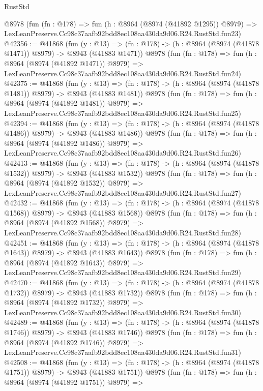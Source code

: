 \begin{lexlean}{RustStd}
\begin{coremodule}
    @8978
    (fun (fn : @178) =>
    fun (h : @8964 (@8974 (@41892 @1295)) @8979) =>
    LexLeanPreserve.Cc98c37aafb92bdd8ec108aa430da9d06.R24.RustStd.fun23)
@42356 := @41868
    (fun (y : @13) =>
    (fn : @178) -> (h : @8964 (@8974 (@41878 @1471)) @8979) -> @8943 (@41883 @1471))
    @8978
    (fun (fn : @178) =>
    fun (h : @8964 (@8974 (@41892 @1471)) @8979) =>
    LexLeanPreserve.Cc98c37aafb92bdd8ec108aa430da9d06.R24.RustStd.fun24)
@42375 := @41868
    (fun (y : @13) =>
    (fn : @178) -> (h : @8964 (@8974 (@41878 @1481)) @8979) -> @8943 (@41883 @1481))
    @8978
    (fun (fn : @178) =>
    fun (h : @8964 (@8974 (@41892 @1481)) @8979) =>
    LexLeanPreserve.Cc98c37aafb92bdd8ec108aa430da9d06.R24.RustStd.fun25)
@42394 := @41868
    (fun (y : @13) =>
    (fn : @178) -> (h : @8964 (@8974 (@41878 @1486)) @8979) -> @8943 (@41883 @1486))
    @8978
    (fun (fn : @178) =>
    fun (h : @8964 (@8974 (@41892 @1486)) @8979) =>
    LexLeanPreserve.Cc98c37aafb92bdd8ec108aa430da9d06.R24.RustStd.fun26)
@42413 := @41868
    (fun (y : @13) =>
    (fn : @178) -> (h : @8964 (@8974 (@41878 @1532)) @8979) -> @8943 (@41883 @1532))
    @8978
    (fun (fn : @178) =>
    fun (h : @8964 (@8974 (@41892 @1532)) @8979) =>
    LexLeanPreserve.Cc98c37aafb92bdd8ec108aa430da9d06.R24.RustStd.fun27)
@42432 := @41868
    (fun (y : @13) =>
    (fn : @178) -> (h : @8964 (@8974 (@41878 @1568)) @8979) -> @8943 (@41883 @1568))
    @8978
    (fun (fn : @178) =>
    fun (h : @8964 (@8974 (@41892 @1568)) @8979) =>
    LexLeanPreserve.Cc98c37aafb92bdd8ec108aa430da9d06.R24.RustStd.fun28)
@42451 := @41868
    (fun (y : @13) =>
    (fn : @178) -> (h : @8964 (@8974 (@41878 @1643)) @8979) -> @8943 (@41883 @1643))
    @8978
    (fun (fn : @178) =>
    fun (h : @8964 (@8974 (@41892 @1643)) @8979) =>
    LexLeanPreserve.Cc98c37aafb92bdd8ec108aa430da9d06.R24.RustStd.fun29)
@42470 := @41868
    (fun (y : @13) =>
    (fn : @178) -> (h : @8964 (@8974 (@41878 @1732)) @8979) -> @8943 (@41883 @1732))
    @8978
    (fun (fn : @178) =>
    fun (h : @8964 (@8974 (@41892 @1732)) @8979) =>
    LexLeanPreserve.Cc98c37aafb92bdd8ec108aa430da9d06.R24.RustStd.fun30)
@42489 := @41868
    (fun (y : @13) =>
    (fn : @178) -> (h : @8964 (@8974 (@41878 @1746)) @8979) -> @8943 (@41883 @1746))
    @8978
    (fun (fn : @178) =>
    fun (h : @8964 (@8974 (@41892 @1746)) @8979) =>
    LexLeanPreserve.Cc98c37aafb92bdd8ec108aa430da9d06.R24.RustStd.fun31)
@42508 := @41868
    (fun (y : @13) =>
    (fn : @178) -> (h : @8964 (@8974 (@41878 @1751)) @8979) -> @8943 (@41883 @1751))
    @8978
    (fun (fn : @178) =>
    fun (h : @8964 (@8974 (@41892 @1751)) @8979) =>

\end{coremodule}
\end{lexlean}
